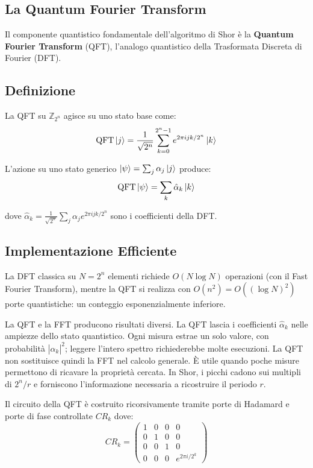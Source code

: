 \begin{onehalfspace}
\section{La Quantum Fourier Transform}

Il componente quantistico fondamentale dell'algoritmo di Shor è la \textbf{Quantum Fourier Transform} (\ac{QFT}), l'analogo quantistico della Trasformata Discreta di Fourier (\ac{DFT}).

\subsection{Definizione}

La QFT su $\mathbb{Z}_{2^n}$ agisce su uno stato base come:
\begin{equation}
    \text{QFT}\ket{j} = \frac{1}{\sqrt{2^n}} \sum_{k=0}^{2^n-1} e^{2\pi i jk / 2^n} \ket{k}
\end{equation}

L'azione su uno stato generico $\ket{\psi} = \sum_j \alpha_j \ket{j}$ produce:
\begin{equation}
    \text{QFT}\ket{\psi} = \sum_k \hat{\alpha}_k \ket{k}
\end{equation}

dove $\hat{\alpha}_k = \frac{1}{\sqrt{2^n}}\sum_j \alpha_j e^{2\pi i jk/2^n}$ sono i coefficienti della DFT.

\clearpage

\subsection{Implementazione Efficiente}

La DFT classica su $N = 2^n$ elementi richiede $O(N \log N)$ operazioni (con il Fast Fourier Transform), mentre la QFT si realizza con $O(n^2) = O((\log N)^2)$ porte quantistiche: un conteggio esponenzialmente inferiore.

La QFT e la FFT producono risultati diversi. La QFT lascia i coefficienti $\hat{\alpha}_k$ nelle ampiezze dello stato quantistico. Ogni misura estrae un solo valore, con probabilità $|\hat{\alpha}_k|^2$; leggere l'intero spettro richiederebbe molte esecuzioni. La QFT non sostituisce quindi la FFT nel calcolo generale. È utile quando poche misure permettono di ricavare la proprietà cercata. In Shor, i picchi cadono sui multipli di $2^n/r$ e forniscono l'informazione necessaria a ricostruire il periodo $r$.

Il circuito della QFT è costruito ricorsivamente tramite porte di Hadamard e porte di fase controllate $CR_k$ dove:
\begin{equation}
    CR_k = \begin{pmatrix} 1&0&0&0\\0&1&0&0\\0&0&1&0\\0&0&0&e^{2\pi i/2^k} \end{pmatrix}
\end{equation}


\end{onehalfspace}
